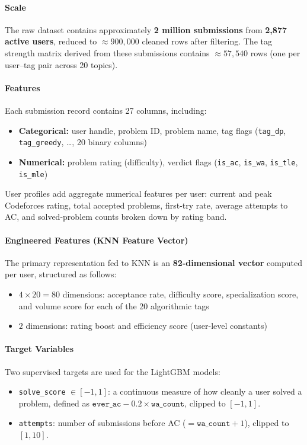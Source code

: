 \documentclass[12pt,a4paper]{article}
\begin{document}
\paragraph{Scale}
The raw dataset contains approximately \textbf{2 million submissions} from
\textbf{2,877 active users}, reduced to ${\approx}900{,}000$ cleaned rows after
filtering. The tag strength matrix derived from these submissions contains
${\approx}57{,}540$ rows (one per user--tag pair across 20 topics).

\paragraph{Features}
Each submission record contains 27 columns, including:
\begin{itemize}
    \item \textbf{Categorical:} user handle, problem ID, problem name, tag flags
          (\texttt{tag\_dp}, \texttt{tag\_greedy}, \ldots, 20 binary columns)
    \item \textbf{Numerical:} problem rating (difficulty), verdict flags
          (\texttt{is\_ac}, \texttt{is\_wa}, \texttt{is\_tle}, \texttt{is\_mle})
\end{itemize}

User profiles add aggregate numerical features per user: current and peak
Codeforces rating, total accepted problems, first-try rate, average attempts to
AC, and solved-problem counts broken down by rating band.

\paragraph{Engineered Features (KNN Feature Vector)}
The primary representation fed to KNN is an \textbf{82-dimensional vector} computed
per user, structured as follows:
\begin{itemize}
    \item $4 \times 20 = 80$ dimensions: acceptance rate, difficulty score,
          specialization score, and volume score for each of the 20 algorithmic tags
    \item $2$ dimensions: rating boost and efficiency score (user-level constants)
\end{itemize}

\paragraph{Target Variables}
Two supervised targets are used for the LightGBM models:
\begin{itemize}
    \item \texttt{solve\_score} $\in [-1, 1]$: a continuous measure of how cleanly a
          user solved a problem, defined as
          $\texttt{ever\_ac} - 0.2 \times \texttt{wa\_count}$, clipped to $[-1,1]$.
    \item \texttt{attempts}: number of submissions before AC
          ($= \texttt{wa\_count} + 1$), clipped to $[1, 10]$.
\end{itemize}
\end{document}
